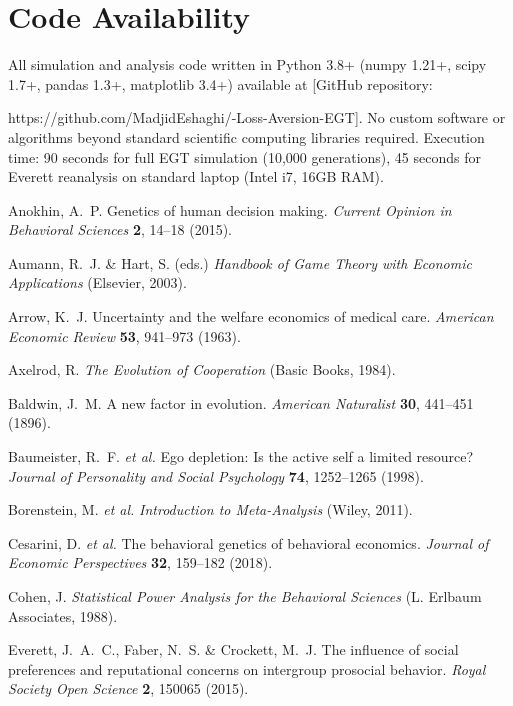 \documentclass[11pt,twocolumn]{article}
\begin{document}
\section*{Code Availability}
All simulation and analysis code written in Python 3.8+ (numpy 1.21+, scipy 1.7+, pandas 1.3+, matplotlib 3.4+) available at [GitHub repository: 

https://github.com/MadjidEshaghi/-Loss-Aversion-EGT]. No custom software or algorithms beyond standard scientific computing libraries required. Execution time: 90 seconds for full EGT simulation (10,000 generations), 45 seconds for Everett reanalysis on standard laptop (Intel i7, 16GB RAM).


\begin{thebibliography}{30}

Anokhin, A.~P. Genetics of human decision making. {\em Current Opinion in Behavioral Sciences} {\bf 2}, 14--18 (2015).

Aumann, R.~J. \& Hart, S. (eds.) {\em Handbook of Game Theory with Economic Applications} (Elsevier, 2003).

Arrow, K.~J. Uncertainty and the welfare economics of medical care. {\em American Economic Review} {\bf 53}, 941--973 (1963).

Axelrod, R. {\em The Evolution of Cooperation} (Basic Books, 1984).

Baldwin, J.~M. A new factor in evolution. {\em American Naturalist} {\bf 30}, 441--451 (1896).

Baumeister, R.~F. {\em et al.} Ego depletion: Is the active self a limited resource? {\em Journal of Personality and Social Psychology} {\bf 74}, 1252--1265 (1998).

Borenstein, M. {\em et al.} {\em Introduction to Meta-Analysis} (Wiley, 2011).

Cesarini, D. {\em et al.} The behavioral genetics of behavioral economics. {\em Journal of Economic Perspectives} {\bf 32}, 159--182 (2018).

Cohen, J. {\em Statistical Power Analysis for the Behavioral Sciences} (L. Erlbaum Associates, 1988).

Everett, J.~A.~C., Faber, N.~S. \& Crockett, M.~J. The influence of social preferences and reputational concerns on intergroup prosocial behavior. {\em Royal Society Open Science} {\bf 2}, 150065 (2015).


\end{thebibliography}
\end{document}
